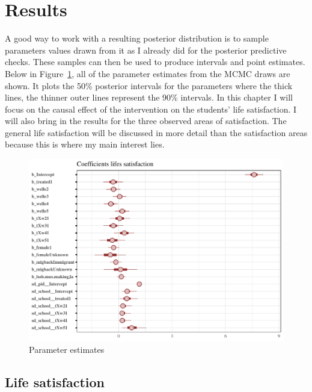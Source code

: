 \documentclass[a4, 12pt]{article}
\begin{document}
\clearpage

\hypertarget{results}{%
\section{Results}\label{results}}

\label{ch:results}
A good way to work with a resulting posterior distribution is to sample parameters values drawn from it as I already did for the posterior predictive checks. These samples can then be used to produce intervals and point estimates.
Below in Figure~\ref{fig:m1-coef}, all of the parameter estimates from the MCMC draws are shown. It plots the 50\% posterior intervals for the parameters where the thick lines, the thinner outer lines represent the 90\% intervals. In this chapter I will focus on the causal effect of the intervention on the students' life satisfaction. I will also bring in the results for the three observed areas of satisfaction. The general life satisfaction will be discussed in more detail than the satisfaction areas because this is where my main interest lies.

\begin{figure}[H]

{\centering \includegraphics[width=0.8\linewidth,]{../figures/m1_coef} 

}

\caption{Parameter estimates}\label{fig:m1-coef}
\end{figure}

\hypertarget{life-satisfaction}{%
\subsection{Life satisfaction}\label{life-satisfaction}}

\label{sec:life-satisfaction}
\end{document}
